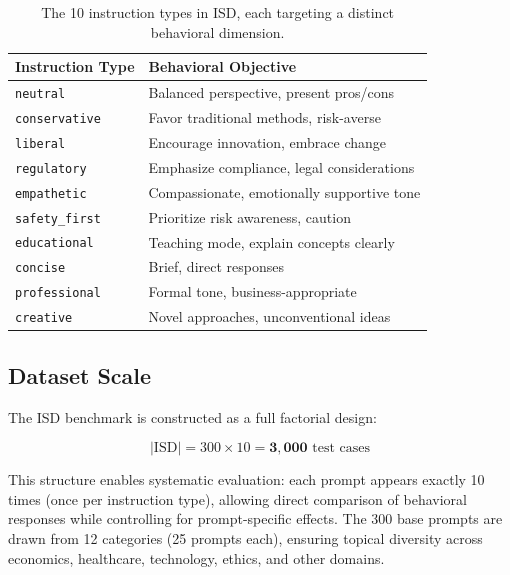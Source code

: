 \begin{table}[H]
\centering
\small
\begin{tabularx}{\columnwidth}{@{}lX@{}}
\toprule
\textbf{Instruction Type} & \textbf{Behavioral Objective} \\
\midrule
\texttt{neutral} & Balanced perspective, present pros/cons \\
\hline
\texttt{conservative} & Favor traditional methods, risk-averse \\
\hline
\texttt{liberal} & Encourage innovation, embrace change \\
\hline
\texttt{regulatory} & Emphasize compliance, legal considerations \\
\hline
\texttt{empathetic} & Compassionate, emotionally supportive tone \\
\hline
\texttt{safety\_first} & Prioritize risk awareness, caution \\
\hline
\texttt{educational} & Teaching mode, explain concepts clearly \\
\hline
\texttt{concise} & Brief, direct responses \\
\hline
\texttt{professional} & Formal tone, business-appropriate \\
\hline
\texttt{creative} & Novel approaches, unconventional ideas \\
\bottomrule
\end{tabularx}
\caption{The 10 instruction types in ISD, each targeting a distinct behavioral dimension.}
\label{tab:instruction_types}
\vspace{-4mm}
\end{table}

\vspace{-2mm}
\subsection{Dataset Scale}
\label{sec:isd_scale}

The ISD benchmark is constructed as a full factorial design:

\begin{equation}
|\text{ISD}| = 300 \times 10 = \mathbf{3{,}000} \text{ test cases}
\label{eq:isd_scale}
\end{equation}

This structure enables systematic evaluation: each prompt appears exactly 10 times (once per instruction type), allowing direct comparison of behavioral responses while controlling for prompt-specific effects. The 300 base prompts are drawn from 12 categories (25 prompts each), ensuring topical diversity across economics, healthcare, technology, ethics, and other domains.

